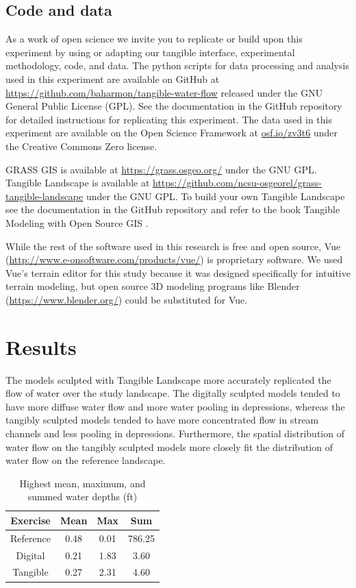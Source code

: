 \documentclass{isprs}
\begin{document}
\subsection{Code and data}

As a work of open science we invite you to
replicate or build upon this experiment by 
using or adapting our tangible interface, experimental methodology, code, and data. 
%
The python scripts for data processing and analysis used in this experiment 
are available on GitHub at \url{https://github.com/baharmon/tangible-water-flow}
released under the GNU General Public License (GPL). 
%
See the documentation in the GitHub repository for detailed instructions for replicating this experiment. 
%
The data used in this experiment are available on the Open Science Framework at \url{osf.io/zv3t6} under the Creative Commons Zero license.

GRASS GIS is available at
\url{https://grass.osgeo.org/} 
under the GNU GPL. 
%
Tangible Landscape is available at
\url{https://github.com/ncsu-osgeorel/grass-tangible-landscape}
under the GNU GPL. 
%
To build your own Tangible Landscape
see the documentation in the GitHub repository 
and refer to the book Tangible Modeling with Open Source GIS \cite{Petrasova2015}.

While the rest of the software used in this research is free and open source, 
Vue (\url{http://www.e-onsoftware.com/products/vue/}) is proprietary software. 
We used Vue's terrain editor for this study because it was designed specifically for intuitive terrain modeling, but 
open source 3D modeling programs like Blender (\url{https://www.blender.org/}) could be substituted for Vue. 
%

\section{Results}\label{sec:results}
%
The models sculpted with Tangible Landscape more accurately replicated the flow of water over the study landscape. 
%
The digitally sculpted models tended to have 
more diffuse water flow
and more water pooling in depressions, whereas 
%
the tangibly sculpted models tended to have 
more concentrated flow in stream channels
and less pooling in depressions.
%
Furthermore, 
the spatial distribution of water flow on the tangibly sculpted models 
more closely fit the distribution of water flow on the reference landscape. 

\begin{table}[h!]
\caption{Highest mean, maximum, and summed water depths (ft)}
\vspace*{0.5em}
\centering
\begin{tabular}{c c c c}
\toprule
Exercise & Mean & Max & Sum\\
\midrule
Reference & 0.48 & 0.01 & 786.25\\
Digital & 0.21 & 1.83 & 3.60\\
Tangible & 0.27 & 2.31 & 4.60\\ 
\bottomrule
\end{tabular}
\label{table:water_depth} 
\end{table}
\end{document}
